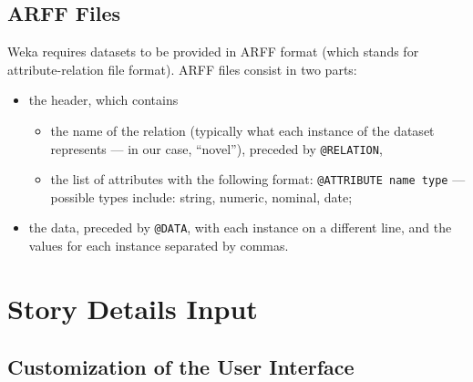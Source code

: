 \documentclass{mproj}
\begin{document}
\subsection*{ARFF Files}

Weka requires datasets to be provided in ARFF format (which stands for attribute-relation file format). \cite{arff} ARFF files consist in two parts:
\begin{itemize}[topsep=0pt]
	\item the header, which contains 
	\begin{itemize}
		\item the name of the relation (typically what each instance of the dataset represents --- in our case, ``novel''), preceded by \verb|@RELATION|,
		\item the list of attributes with the following format: \verb|@ATTRIBUTE name type| --- possible types include: string, numeric, nominal, date;
	\end{itemize}
	\item the data, preceded by \verb|@DATA|, with each instance on a different line, and the values for each instance separated by commas.
\end{itemize}

\section{Story Details Input}

\subsection*{Customization of the User Interface}
\end{document}

